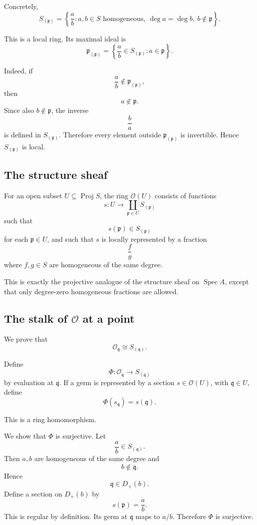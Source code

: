 \documentclass[12pt,a4paper]{article}
\DeclareMathOperator{\Spec}{Spec}
\DeclareMathOperator{\Proj}{Proj}
\theoremstyle{notespace}
\begin{document}
Concretely,
\[
S_{(\mathfrak p)}
=
\left\{
\frac{a}{b} :
a,b\in S \text{ homogeneous},\ \deg a=\deg b,\ b\notin \mathfrak p
\right\}.
\]

This is a local ring. Its maximal ideal is
\[
\mathfrak p_{(\mathfrak p)}
=
\left\{
\frac{a}{b}\in S_{(\mathfrak p)} : a\in \mathfrak p
\right\}.
\]

Indeed, if
\[
\frac{a}{b}\notin \mathfrak p_{(\mathfrak p)},
\]
then
\[
a\notin \mathfrak p.
\]
Since also \(b\notin \mathfrak p\), the inverse
\[
\frac{b}{a}
\]
is defined in \(S_{(\mathfrak p)}\). Therefore every element outside
\(\mathfrak p_{(\mathfrak p)}\) is invertible. Hence \(S_{(\mathfrak p)}\) is local.

\subsection{The structure sheaf}

For an open subset \(U\subseteq \Proj S\), the ring \(\mathcal O(U)\) consists of
functions
\[
s:U\longrightarrow \coprod_{\mathfrak p\in U}S_{(\mathfrak p)}
\]
such that
\[
s(\mathfrak p)\in S_{(\mathfrak p)}
\]
for each \(\mathfrak p\in U\), and such that \(s\) is locally represented by a fraction
\[
\frac{f}{g}
\]
where \(f,g\in S\) are homogeneous of the same degree.

This is exactly the projective analogue of the structure sheaf on \(\Spec A\), except
that only degree-zero homogeneous fractions are allowed.

\subsection{The stalk of \texorpdfstring{$\mathcal O$}{O} at a point}

We prove that
\[
\mathcal O_{\mathfrak q}\cong S_{(\mathfrak q)}.
\]

Define
\[
\Phi:\mathcal O_{\mathfrak q}\longrightarrow S_{(\mathfrak q)}
\]
by evaluation at \(\mathfrak q\). If a germ is represented by a section \(s\in\mathcal O(U)\),
with \(\mathfrak q\in U\), define
\[
\Phi(s_{\mathfrak q})=s(\mathfrak q).
\]

This is a ring homomorphism.

We show that \(\Phi\) is surjective. Let
\[
\frac{a}{b}\in S_{(\mathfrak q)}.
\]
Then \(a,b\) are homogeneous of the same degree and
\[
b\notin \mathfrak q.
\]
Hence
\[
\mathfrak q\in D_+(b).
\]
Define a section on \(D_+(b)\) by
\[
s(\mathfrak p)=\frac{a}{b}.
\]
This is regular by definition. Its germ at \(\mathfrak q\) maps to \(a/b\). Therefore
\(\Phi\) is surjective.
\end{document}
